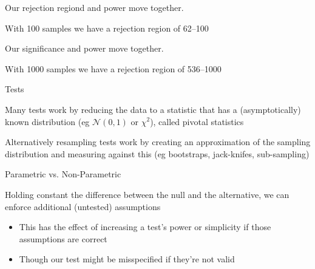 \documentclass{beamer}
\begin{document}
\begin{frame}
	\begin{card}Our rejection regiond and power move together. 
	
	With 100 samples we have a rejection region of 62--100
	\end{card}

\begin{center}\end{center}
\end{frame}
\begin{frame}
	\begin{card}Our significance and power move together. 
	
	With 1000 samples we have a rejection region of 536--1000
	\end{card}

\begin{center}\end{center}
\end{frame}


\begin{frame}{Tests}
	\begin{card} Many tests work by reducing the data to a statistic that has a (asymptotically) known distribution (eg $\mathcal{N}(0,1)$ or $\chi^2$), called pivotal statistics
	\end{card}
	\begin{card} Alternatively resampling tests work by creating an approximation of the sampling distribution and measuring against this (eg bootstraps, jack-knifes, sub-sampling)
	\end{card}
\end{frame}

\begin{frame}{Parametric vs. Non-Parametric}
	\begin{card}
		 Holding constant the difference between the null and the alternative, we can enforce additional (untested) assumptions
		 \begin{itemize}
		\item This has the effect of increasing a test's power or simplicity if those assumptions are correct
		\item Though our test might be misspecified if they're not valid
		\end{itemize}
	\end{card}
	
\end{frame}
\end{document}
